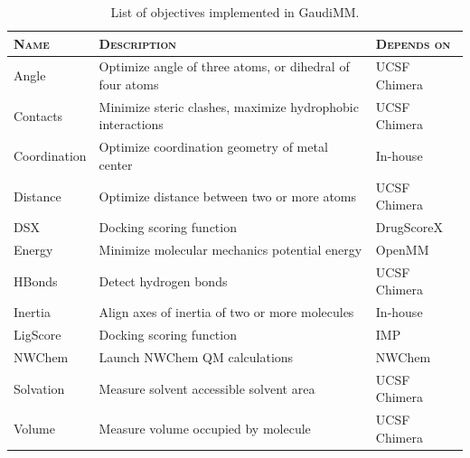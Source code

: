 \begin{table}[hbtp]
	\caption[List of objectives implemented in GaudiMM]{List of objectives implemented in GaudiMM.}
	\label{table:gaudi-objectives}
\footnotesize
{}%
%
%
\begin{tabularx}{\textwidth}{LMR}
\toprule
\textsc{Name} & \textsc{Description} & \textsc{Depends on} \\
\toprule
 Angle & Optimize angle of three atoms, or dihedral of four atoms & UCSF Chimera \\
\hhline{~~~}
 Contacts & Minimize steric clashes, maximize hydrophobic interactions & UCSF Chimera \\
\hhline{~~~}
 Coordination & Optimize coordination geometry of metal center & In-house\cite{gaudimetals} \\
\hhline{~~~}
 Distance & Optimize distance between two or more atoms & UCSF Chimera \\
\hhline{~~~}
 DSX & Docking scoring function  & DrugScoreX\cite{neudert2011dsx} \\
\hhline{~~~}
 Energy & Minimize molecular mechanics potential energy & OpenMM\cite{openmm} \\
\hhline{~~~}
 HBonds & Detect hydrogen bonds  & UCSF Chimera \\
\hhline{~~~}
 Inertia & Align axes of inertia of two or more molecules & In-house \\
\hhline{~~~}
 LigScore & Docking scoring function & IMP\cite{krammer2005ligscore} \\
\hhline{~~~}
 NWChem & Launch NWChem QM calculations & NWChem\cite{nwchem} \\
\hhline{~~~}
 Solvation & Measure solvent accessible solvent area & UCSF Chimera \\
\hhline{~~~}
 Volume & Measure volume occupied by molecule & UCSF Chimera \\
\bottomrule

\end{tabularx}
 \end{table}





